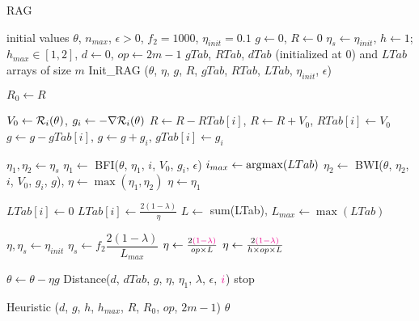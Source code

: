 \begin{algorithm}[h!]
	\caption{RAG}
	\label{algo_RAG}
	\begin{algorithmic}[1]
                \REQUIRE initial values $\theta$, $n_{max}$, $\epsilon>0$,  $f_2=1000$, $\eta_{init}=0.1$ 
                \STATE $g \leftarrow 0$, $R \leftarrow 0$
		\STATE $\eta_s \leftarrow \eta_{init}$, $h\leftarrow 1$; $h_{max}\in [1,2]$, $d\leftarrow 0$, $op\leftarrow 2m-1$
		\STATE $gTab$, $RTab$, $dTab$ (initialized at 0) and $LTab$ arrays of size $m$
		\STATE Init\_RAG ($\theta$, $\eta$, $g$, $R$, $gTab$, $RTab$, $LTab$, $\eta_{init}$, $\epsilon$)
		
		\STATE $R_0 \leftarrow R$
		
		
		\STATE $V_0 \leftarrow \mathcal{R}_i(\theta)$, $g_i \leftarrow -\nabla \mathcal{R}_i(\theta)$
		\STATE $R \leftarrow R-RTab[i]$, $R \leftarrow R+V_0$, $RTab[i] \leftarrow V_0$
		\STATE $g\leftarrow g-gTab[i]$, $g \leftarrow g+g_i$, $gTab[i] \leftarrow g_i$
		
		\STATE $\eta_1, \eta_2 \leftarrow \eta_s$
		\STATE $\eta_1 \leftarrow$ BFI($\theta$, $\eta_1$, $i$, $V_0$, $g_i$, $\epsilon$)
		\STATE $i_{max} \leftarrow \operatorname*{\arg\!\max}(LTab)$
		\STATE $\eta_2 \leftarrow$ BWI($\theta$, $\eta_2$, $i$, $V_0$, $g_i$, $g$), \STATE $\eta \leftarrow \max(\eta_1,\eta_2)$
		\ELSE
		\STATE $\eta \leftarrow \eta_1$
		\ENDIF
		
		\STATE $LTab[i] \leftarrow 0$
		\ELSE
		\STATE $LTab[i] \leftarrow \frac{2(1-\lambda)}{\eta}$
		\ENDIF
		\STATE $L \leftarrow$ sum(LTab), $L_{max} \leftarrow \max(LTab)$
		
		\STATE $\eta,\eta_s \leftarrow \eta_{init}$
		\ELSE
		\STATE $\eta_s \leftarrow f_2\dfrac{2(1-\lambda)}{L_{max}}$
                \STATE $\eta \leftarrow \frac{2\textcolor{magenta}{(1-\lambda)}}{op \times L}$
		\ELSE
		\STATE $\eta \leftarrow \frac{2\textcolor{magenta}{(1-\lambda)}}{h \times op \times L}$
		\ENDIF
		\ENDIF
		
		\STATE $\theta \leftarrow \theta -\eta g$
                \STATE Distance($d$, $dTab$, $g$, $\eta$, $\eta_1$, $\lambda$, $\epsilon$, $\textcolor{magenta}{i}$)
		\STATE stop
		\ENDIF

		\ENDFOR
		\STATE Heuristic ($d$, $g$, $h$, $h_{max}$, $R$, $R_0$, $op$, $2m-1$)
		\ENDWHILE
		\RETURN $\theta$
	\end{algorithmic}
\end{algorithm}

